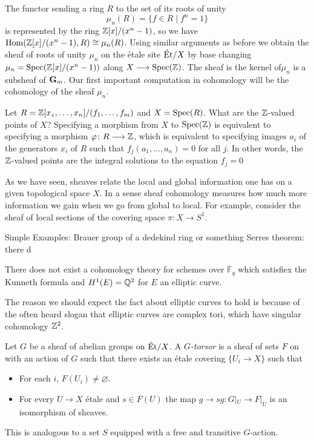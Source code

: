\begin{example}
	The functor sending a ring $R$ to the set of its roots of unity
	\[
		\mu_n(R) = \{f \in R \mid f^n = 1\}
	\]
	is represented by the ring $\mathbb{Z}[x]/(x^n-1)$, so we have $\operatorname{Hom}(\mathbb{Z}[x]/(x^n-1),R) \cong \mu_n(R)$. Using similar arguments as before we obtain the sheaf of roots of unity $\mu_n$ on the \'etale site $\text{\'Et}/X$ by base changing $\mu_n = \operatorname{Spec}(\mathbb{Z}[x]/(x^n-1))$ along $X \longrightarrow \operatorname{Spec}(\mathbb{Z})$. The sheaf is the kernel of$\mu_n$ is a subsheaf of $\mathbf{G}_m$. Our first important computation in cohomology will be the cohomology of the sheaf $\mu_n$.
\end{example}

\begin{example}
	Let $R=\mathbb{Z}[x_z, \dots, x_n]/(f_1, \dots , f_m)$ and $X = \operatorname{Spec}(R)$. What are the $\mathbb{Z}$-valued points of $X$? Specifying a morphism from $X$ to $\operatorname{Spec}(\mathbb{Z})$ is equivalent to specifying a morphism $\varphi\colon R \longrightarrow \mathbb{Z}$, which is equivalent to specifying images $a_i$ of the generators $x_i$ of $R$ such that $f_j(a_1, \dots, a_n) = 0$ for all $j$. In other words, the $\mathbb{Z}$-valued points are the integral solutions to the equation $f_j = 0$
\end{example}







As we have seen, sheaves relate the local and global information one has on a given topological space $X$. In a sense sheaf cohomology measures how much more information we gain when we go from global to local. For example, consider the sheaf of local sections of the covering space $\pi : X \to S^1$.

Simple Examples:
Brauer group of a dedekind ring or something
Serres theorem: there d
\begin{theorem}
	There does not exist a cohomology theory for schemes over $\overline{\mathbb{F}}_q$ which satisfiex the Kunneth formula and $H^1(E) = \mathbb{Q}^2$ for $E$ an elliptic curve.
\end{theorem}
The reason we should expect the fact about elliptic curves to hold is because of the often heard slogan that elliptic curves are complex tori, which have singular cohomology $\mathbb{Z}^2$.


\begin{definition}
	Let $G$ be a sheaf of abelian groups on $\text{\'Et}/X$. A \textit{$G$-torsor} is a sheaf of sets $F$ on with an action of $G$ such that there exists an \'etale covering $\{U_i \to X\}$ such that
	\begin{itemize}
		\item For each $i$, $F(U_i) \neq \varnothing$.
		\item For every $U \to X$ \'etale and $s \in F(U)$ the map $g \to sg \colon G|_U \to F|_U$ is an isomorphism of sheaves.
	\end{itemize}
	This is analogous to a set $S$ equipped with a free and transitive $G$-action.
\end{definition}

\begin{theorem}
\end{theorem}
